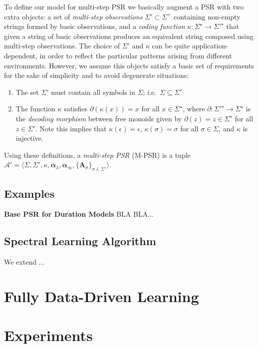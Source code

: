 \documentclass[letterpaper]{article}
\newcommand{\mat}[1]{\mathbf{#1}}
\newcommand{\A}{\mat{A}}
\newcommand{\aone}{\boldsymbol{\alpha}_\lambda}
\newcommand{\ainf}{\boldsymbol{\alpha}_{\infty}}
\newcommand{\psrA}{\mathcal{A}}
\newcommand{\mpsrsigma}{\langle \Sigma, \Sigma', \kappa, \aone, \ainf, \{\A_\sigma\}_{\sigma \in \Sigma'} \rangle}
\begin{document}
To define our model for multi-step PSR we basically augment a PSR with two extra objects: a set of \emph{multi-step observations} $\Sigma' \subset \Sigma^+$ containing non-empty strings formed by basic observations, and a \emph{coding function} $\kappa : \Sigma^\star \to {\Sigma'}^{\star}$ that given a string of basic observations produces an equivalent string composed using multi-step observations.
%
The choice of $\Sigma'$ and $\kappa$ can be quite application-dependent, in order to reflect the particular patterns arising from different environments. However, we assume this objects satisfy a basic set of requirements for the sake of simplicity and to avoid degenerate situations:
\begin{enumerate}
\item The set $\Sigma'$ must contain all symbols in $\Sigma$; i.e.\ $\Sigma \subseteq \Sigma'$
\item The function $\kappa$ satisfies $\partial(\kappa(x)) = x$ for all $x \in \Sigma^\star$, where $\partial : {\Sigma'}^\star \to \Sigma^\star$ is the \emph{decoding morphism} between free monoids given by $\partial(z) = z \in \Sigma^\star$ for all $z \in \Sigma'$. Note this implies that $\kappa(\epsilon) = \epsilon$, $\kappa(\sigma) = \sigma$ for all $\sigma \in \Sigma$, and $\kappa$ is injective.
\end{enumerate}

Using these definitions, a \emph{multi-step PSR} (M-PSR) is a tuple $\psrA' = \mpsrsigma$.

\subsection{Examples}

\textbf{Base PSR for Duration Models} BLA BLA...

\subsection{Spectral Learning Algorithm}

We extend \cite{bootspsr}...

\section{Fully Data-Driven Learning}

\section{Experiments}
\end{document}
